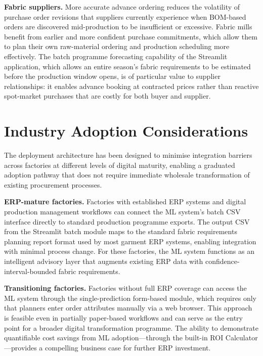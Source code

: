 \textbf{Fabric suppliers.} More accurate advance ordering reduces the volatility of purchase order revisions that suppliers currently experience when BOM-based orders are discovered mid-production to be insufficient or excessive. Fabric mills benefit from earlier and more confident purchase commitments, which allow them to plan their own raw-material ordering and production scheduling more effectively. The batch programme forecasting capability of the Streamlit application, which allows an entire season's fabric requirements to be estimated before the production window opens, is of particular value to supplier relationships: it enables advance booking at contracted prices rather than reactive spot-market purchases that are costly for both buyer and supplier.

\secdiv
\section{Industry Adoption Considerations}
\label{sec:adoption}

The deployment architecture has been designed to minimise integration barriers across factories at different levels of digital maturity, enabling a graduated adoption pathway that does not require immediate wholesale transformation of existing procurement processes.

\textbf{ERP-mature factories.} Factories with established ERP systems and digital production management workflows can connect the ML system's batch CSV interface directly to standard production programme exports. The output CSV from the Streamlit batch module maps to the standard fabric requirements planning report format used by most garment ERP systems, enabling integration with minimal process change. For these factories, the ML system functions as an intelligent advisory layer that augments existing ERP data with confidence-interval-bounded fabric requirements.

\textbf{Transitioning factories.} Factories without full ERP coverage can access the ML system through the single-prediction form-based module, which requires only that planners enter order attributes manually via a web browser. This approach is feasible even in partially paper-based workflows and can serve as the entry point for a broader digital transformation programme. The ability to demonstrate quantifiable cost savings from ML adoption---through the built-in ROI Calculator---provides a compelling business case for further ERP investment.

